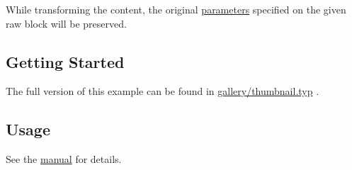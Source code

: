While transforming the content, the original
\href{https://typst.app/docs/reference/text/raw/\#parameters}{parameters}
specified on the given raw block will be preserved.

\subsection{Getting Started}\label{getting-started}

The full version of this example can be found in
\href{https://github.com/typst/packages/raw/main/packages/preview/crudo/0.1.1/gallery/thumbnail.typ}{gallery/thumbnail.typ}
.

\begin{Shaded}
\begin{Highlighting}[]


\NormalTok{\textasciigrave{}\textasciigrave{}\textasciigrave{}}


\NormalTok{\}}
\NormalTok{\textasciigrave{}\textasciigrave{}\textasciigrave{})}
\NormalTok{\textasciigrave{}\textasciigrave{}\textasciigrave{}\textasciigrave{}}




\end{Highlighting}
\end{Shaded}


\subsection{Usage}\label{usage}

See the
\href{https://github.com/typst/packages/raw/main/packages/preview/crudo/0.1.1/docs/manual.pdf}{manual}
for details.

